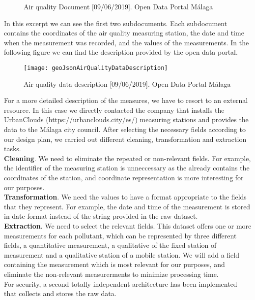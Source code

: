 \begin{figure}[ht]
    \centering
    \hfill
    \caption{Air quality Document [09/06/2019]. Open Data Portal Málaga}
\end{figure}
    
In this excerpt we can see the first two subdocuments.
Each subdocument contains the coordinates of the air quality measuring station, the date and time when the measurement was recorded, and the values of the measurements.
In the following figure we can find the description provided by the open data portal.\\
    
\begin{figure}[ht]
    \centering
    \texttt{[image: geoJsonAirQualityDataDescription]}
    \caption{Air quality data description [09/06/2019]. Open Data Portal Málaga}
\end{figure}

For a more detailed description of the measures, we have to resort to an external resource.
In this case we directly contacted the company that installs the UrbanClouds (https://urbanclouds.city/es/) measuring stations and provides the data to the Málaga city council.
After selecting the necessary fields according to our design plan, we carried out different cleaning, transformation and extraction tasks. \\

\textbf{Cleaning}. We need to eliminate the repeated or non-relevant fields.
For example, the identifier of the measuring station is unneccessary as the  already contains the coordinates of the station, and coordinate representation is more interesting for our purposes. \\

\textbf{Transformation}. We need the values to have a format appropriate to the fields that they represent.
For example, the date and time of the measurement is stored in date format instead of the string provided in the raw dataset. \\

\textbf{Extraction}. We need to select the relevant fields.
This dataset offers one or more measurements for each pollutant, which can be represented by three different fields, a quantitative measurement, a qualitative of the fixed station of measurement and a qualitative station of a mobile station.
We will add a field containing the measurement which is most relevant for our purposes, and eliminate the non-relevant measurerments to minimize processing time. \\

For security, a second totally independent architecture has been implemented that collects and stores the raw data.